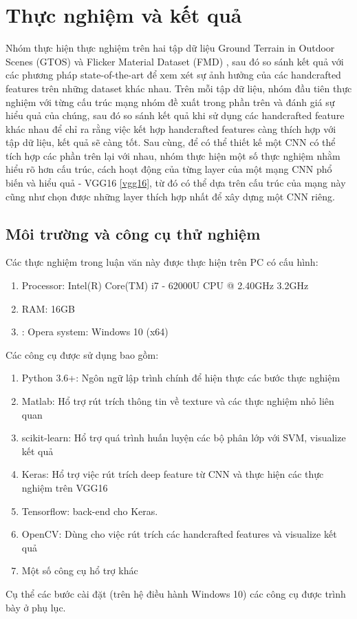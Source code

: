\chapter{Thực nghiệm và kết quả}
\ifpdf
    \graphicspath{{Chapter5/Chapter5Figs/PNG/}{Chapter5/Chapter5Figs/PDF/}{Chapter5/Chapter5Figs/}}
\else
    \graphicspath{{Chapter5/Chapter5Figs/EPS/}{Chapter5/Chapter5Figs/}}
\fi

Nhóm thực hiện thực nghiệm trên hai tập dữ liệu Ground Terrain in Outdoor Scenes (GTOS) \cite{xue2017differential} và Flicker Material Dataset (FMD) \cite{degol2016geometry}, sau đó so sánh kết quả với các phương pháp state-of-the-art để xem xét sự ảnh hưởng của các handcrafted features trên những dataset khác nhau.
Trên mỗi tập dữ liệu, nhóm đầu tiên thực nghiệm với từng cấu trúc mạng nhóm đề xuất trong phần trên và đánh giá sự hiểu quả của chúng, sau đó so sánh kết quả khi sử dụng các handcrafted feature khác nhau để chỉ ra rằng việc kết hợp handcrafted features càng thích hợp với tập dữ liệu, kết quả sẽ càng tốt. Sau cùng, để có thể thiết kế một CNN có thể tích hợp các phần trên lại với nhau, nhóm thực hiện một số thực nghiệm nhằm hiểu rõ hơn cấu trúc, cách hoạt động của từng layer của một mạng CNN phổ biến và hiểu quả - VGG16 \ref{vgg16}, từ đó có thể dựa trên cấu trúc của mạng này cũng như chọn được những layer thích hợp nhất để xây dựng một CNN riêng.

\section{Môi trường và công cụ thử nghiệm}
Các thực nghiệm trong luận văn này được thực hiện trên PC có cấu hình:
\begin{enumerate}
\item Processor: Intel(R) Core(TM) i7 - 62000U CPU @ 2.40GHz 3.2GHz
\item RAM: 16GB
\item: Opera system: Windows 10 (x64)
\end{enumerate}
Các công cụ được sử dụng bao gồm:
\begin{enumerate}
\item Python 3.6+: Ngôn ngữ lập trình chính để hiện thực các bước thực nghiệm
\item Matlab: Hổ trợ rút trích thông tin về texture và các thực nghiệm nhỏ liên quan
\item scikit-learn: Hổ trợ quá trình huấn luyện các bộ phân lớp với SVM, visualize kết quả 
\item Keras: Hổ trợ việc rút trích deep feature từ CNN và thực hiện các thực nghiệm trên VGG16
\item Tensorflow: back-end cho Keras.
\item OpenCV: Dùng cho việc rút trích các handcrafted features và visualize kết quả
\item Một số công cụ hổ trợ khác
\end{enumerate}
Cụ thể các bước cài đặt (trên hệ điều hành Windows 10) các công cụ được trình bày ở phụ lục.

